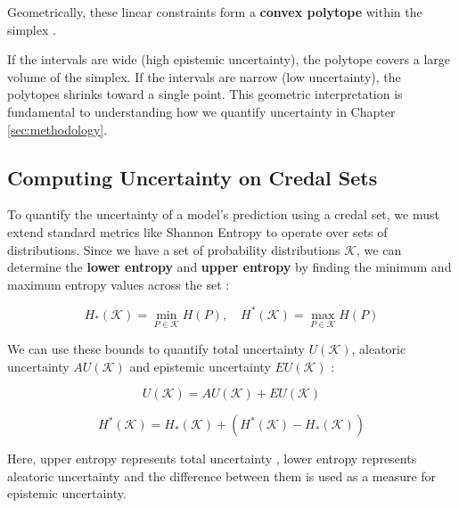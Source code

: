 Geometrically, these linear constraints form a \textbf{convex polytope}
within the simplex
\parencite{article}.

If the intervals are wide (high epistemic uncertainty), the polytope
covers a large volume of the simplex. If the intervals are narrow
(low uncertainty), the polytopes shrinks toward a single point.
This geometric interpretation is fundamental to understanding how
we quantify uncertainty in Chapter \ref{sec:methodology}.


\subsection{Computing Uncertainty on Credal Sets}
\label{sec:background:credal_sets:uncertainty}
To quantify the uncertainty of a model's prediction 
using a credal set, we must extend standard metrics like 
Shannon Entropy to operate over sets of distributions.
Since we have a set of probability distributions $\mathcal{K}$, 
we can determine the \textbf{lower entropy} and  
\textbf{upper entropy} \parencite{ABELLAN2005235} 
by finding the minimum and maximum entropy 
values across the set \parencite{Abellán01022006, H_llermeier_2021}:

\begin{equation}
    H_*(\mathcal{K}) = \min_{P \in \mathcal{K}} H(P), 
	\quad H^*(\mathcal{K}) = \max_{P \in \mathcal{K}} H(P)
    \label{eq:lower_upper_entropy}
\end{equation}

We can use these bounds to quantify total uncertainty $U(\mathcal{K})$,
aleatoric uncertainty $AU(\mathcal{K})$ and epistemic uncertainty 
$EU(\mathcal{K})$ \parencite{Abellán01022006, H_llermeier_2021}:

\begin{equation}
    U(\mathcal{K}) = AU(\mathcal{K}) + EU(\mathcal{K})
    \label{eq:credal_total_uncertainty}
\end{equation}

\begin{equation}
    H^*(\mathcal{K}) = H_*(\mathcal{K}) + 
	\left(H^*(\mathcal{K}) - H_*(\mathcal{K})\right)
    \label{eq:credal_uncertainty}
\end{equation}

Here, upper entropy represents total uncertainty \parencite{ABELLAN2005235},
lower entropy represents aleatoric uncertainty and the difference 
between them is used as a measure for epistemic uncertainty. 

